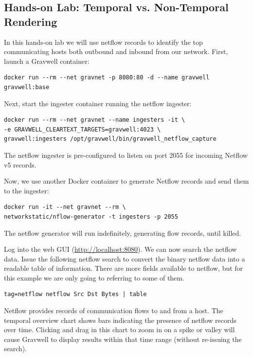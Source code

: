\clearpage
\subsection{Hands-on Lab: Temporal vs. Non-Temporal Rendering}

In this hands-on lab we will use netflow records to identify the top
communicating hosts both outbound and inbound from our network. First, launch
a Gravwell container:

\begin{Verbatim}[breaklines=true]
docker run --rm --net gravnet -p 8080:80 -d --name gravwell gravwell:base
\end{Verbatim}

Next, start the ingester container running the netflow ingester:

\begin{Verbatim}[breaklines=true]
docker run --rm --net gravnet --name ingesters -it \
-e GRAVWELL_CLEARTEXT_TARGETS=gravwell:4023 \
gravwell:ingesters /opt/gravwell/bin/gravwell_netflow_capture
\end{Verbatim}

The netflow ingester is pre-configured to listen on port 2055 for
incoming Netflow v5 records.

Now, we use another Docker container to generate Netflow records and
send them to the ingester:

\begin{Verbatim}[breaklines=true]
docker run -it --net gravnet --rm \
networkstatic/nflow-generator -t ingesters -p 2055
\end{Verbatim}

The netflow generator will run indefinitely, generating flow records,
until killed.

Log into the web GUI (\href{http://localhost:8080}{http://localhost:8080}).
We can now search the netflow data. Issue the following netflow search to convert the binary netflow data
into a readable table of information. There are more fields available to
netflow, but for this example we are only going to referring to some of
them.

\begin{Verbatim}[breaklines=true]
tag=netflow netflow Src Dst Bytes | table
\end{Verbatim}

Netflow provides records of communication flows to and from a host. The
temporal overview chart shows bars indicating the presence of netflow
records over time. Clicking and drag in this chart to zoom in on a spike or
valley will cause Gravwell to display results within that time
range (without re-issuing the search).

